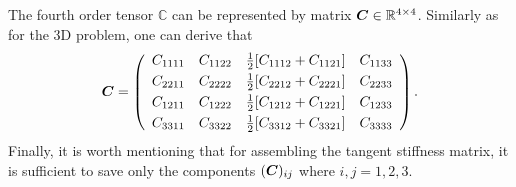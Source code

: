 \documentclass[a4paper,12pt]{article}
\theoremstyle{remark}
\newcommand{\mbf}[1]{\mbox{\boldmath$#1$}}
\numberwithin{equation}{section}
\begin{document}
The fourth order tensor $\mathbb C$ can be represented by matrix $\mbf C\in\mathbb R^{4\times 4}$. Similarly as for the 3D problem, one can derive that
$$\mbf C=\left(
\begin{array}{c c c c}
C_{1111} & C_{1122} & \frac{1}{2}[C_{1112}+C_{1121}] & C_{1133} \\[1mm]
C_{2211} & C_{2222} & \frac{1}{2}[C_{2212}+C_{2221}] & C_{2233} \\[1mm]
C_{1211} & C_{1222} & \frac{1}{2}[C_{1212}+C_{1221}] & C_{1233} \\[1mm]
C_{3311} & C_{3322} & \frac{1}{2}[C_{3312}+C_{3321}] & C_{3333} 
\end{array}
\right).$$
Finally, it is worth mentioning that for assembling the tangent stiffness matrix, it is sufficient to save only the components $(\mbf C)_{ij}$ where $i,j=1,2,3$.




\end{document}
